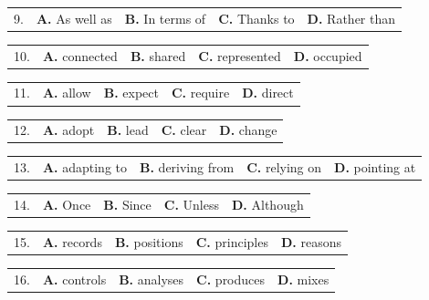 \documentclass[UTF8,11pt]{ctexart}
\begin{document}
\noindent\begin{tabularx}{\linewidth}{@{}lXXXX@{}}9. & \textbf{A.} As well as & \textbf{B.} In terms of & \textbf{C.} Thanks to & \textbf{D.} Rather than\\\end{tabularx}\par

\noindent\begin{tabularx}{\linewidth}{@{}lXXXX@{}}10. & \textbf{A.} connected & \textbf{B.} shared & \textbf{C.} represented & \textbf{D.} occupied\\\end{tabularx}\par

\noindent\begin{tabularx}{\linewidth}{@{}lXXXX@{}}11. & \textbf{A.} allow & \textbf{B.} expect & \textbf{C.} require & \textbf{D.} direct\\\end{tabularx}\par

\noindent\begin{tabularx}{\linewidth}{@{}lXXXX@{}}12. & \textbf{A.} adopt & \textbf{B.} lead & \textbf{C.} clear & \textbf{D.} change\\\end{tabularx}\par

\noindent\begin{tabularx}{\linewidth}{@{}lXXXX@{}}13. & \textbf{A.} adapting to & \textbf{B.} deriving from & \textbf{C.} relying on & \textbf{D.} pointing at\\\end{tabularx}\par

\noindent\begin{tabularx}{\linewidth}{@{}lXXXX@{}}14. & \textbf{A.} Once & \textbf{B.} Since & \textbf{C.} Unless & \textbf{D.} Although\\\end{tabularx}\par

\noindent\begin{tabularx}{\linewidth}{@{}lXXXX@{}}15. & \textbf{A.} records & \textbf{B.} positions & \textbf{C.} principles & \textbf{D.} reasons\\\end{tabularx}\par

\noindent\begin{tabularx}{\linewidth}{@{}lXXXX@{}}16. & \textbf{A.} controls & \textbf{B.} analyses & \textbf{C.} produces & \textbf{D.} mixes\\\end{tabularx}\par
\end{document}

